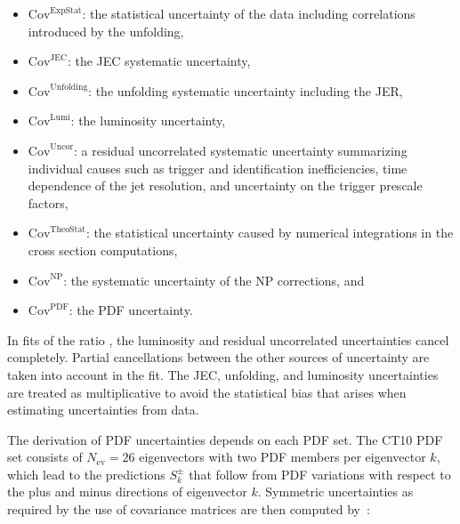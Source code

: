 \begin{itemize}
\item{$\mathrm{Cov}^\mathrm{ExpStat}$: the statistical uncertainty of the
    data including correlations introduced by the unfolding,}
\item{$\mathrm{Cov}^\mathrm{JEC}$: the JEC
systematic uncertainty,}
\item{$\mathrm{Cov}^\mathrm{Unfolding}$: the unfolding systematic
    uncertainty including the JER,}
\item{$\mathrm{Cov}^\mathrm{Lumi}$: the luminosity uncertainty,}
\item{$\mathrm{Cov}^\mathrm{Uncor}$: a residual uncorrelated
    systematic uncertainty summarizing individual causes such as trigger and identification
    inefficiencies, time dependence of the
    jet \pt resolution, and uncertainty on the trigger prescale
    factors,}
\item{$\mathrm{Cov}^\mathrm{TheoStat}$: the statistical uncertainty caused
    by numerical integrations in the cross section computations,}
\item{$\mathrm{Cov}^\mathrm{NP}$: the systematic uncertainty of the
    NP corrections, and}
\item{$\mathrm{Cov}^\mathrm{PDF}$: the PDF uncertainty.}
\end{itemize}

In fits of the ratio \ratio, the luminosity and residual uncorrelated uncertainties cancel completely. Partial cancellations between the other sources of uncertainty are taken into account in the fit. The JEC, unfolding, and luminosity uncertainties are treated as multiplicative to avoid the statistical bias that arises when estimating uncertainties from data.


The derivation of PDF uncertainties depends on each PDF set. The CT10 PDF set consists of $N_\mathrm{ev}=26$ eigenvectors with two PDF members per eigenvector $k$, which lead to the predictions $S_{k}^{\pm}$ that follow from PDF variations with respect to the plus and minus directions of eigenvector $k$. Symmetric uncertainties as required by the use of covariance matrices are then computed by~\cite{Pumplin:2002vw}:

